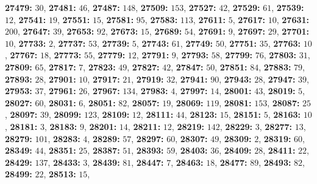 \textsf{\bfseries 27479:} $30$, \textsf{\bfseries 27481:} $46$, \textsf{\bfseries 27487:} $148$, \textsf{\bfseries 27509:} $153$, \textsf{\bfseries 27527:} $42$, \textsf{\bfseries 27529:} $61$, \textsf{\bfseries 27539:} $12$, \textsf{\bfseries 27541:} $19$, \textsf{\bfseries 27551:} $15$, \textsf{\bfseries 27581:} $95$, \textsf{\bfseries 27583:} $113$, \textsf{\bfseries 27611:} $5$, \textsf{\bfseries 27617:} $10$, \textsf{\bfseries 27631:} $200$, \textsf{\bfseries 27647:} $39$, \textsf{\bfseries 27653:} $92$, \textsf{\bfseries 27673:} $15$, \textsf{\bfseries 27689:} $54$, \textsf{\bfseries 27691:} $9$, \textsf{\bfseries 27697:} $29$, \textsf{\bfseries 27701:} $10$, \textsf{\bfseries 27733:} $2$, \textsf{\bfseries 27737:} $53$, \textsf{\bfseries 27739:} $5$, \textsf{\bfseries 27743:} $61$, \textsf{\bfseries 27749:} $50$, \textsf{\bfseries 27751:} $35$, \textsf{\bfseries 27763:} $10$, \textsf{\bfseries 27767:} $18$, \textsf{\bfseries 27773:} $55$, \textsf{\bfseries 27779:} $12$, \textsf{\bfseries 27791:} $9$, \textsf{\bfseries 27793:} $58$, \textsf{\bfseries 27799:} $76$, \textsf{\bfseries 27803:} $31$, \textsf{\bfseries 27809:} $65$, \textsf{\bfseries 27817:} $7$, \textsf{\bfseries 27823:} $49$, \textsf{\bfseries 27827:} $42$, \textsf{\bfseries 27847:} $50$, \textsf{\bfseries 27851:} $84$, \textsf{\bfseries 27883:} $79$, \textsf{\bfseries 27893:} $28$, \textsf{\bfseries 27901:} $10$, \textsf{\bfseries 27917:} $21$, \textsf{\bfseries 27919:} $32$, \textsf{\bfseries 27941:} $90$, \textsf{\bfseries 27943:} $28$, \textsf{\bfseries 27947:} $39$, \textsf{\bfseries 27953:} $37$, \textsf{\bfseries 27961:} $26$, \textsf{\bfseries 27967:} $134$, \textsf{\bfseries 27983:} $4$, \textsf{\bfseries 27997:} $14$, \textsf{\bfseries 28001:} $43$, \textsf{\bfseries 28019:} $5$, \textsf{\bfseries 28027:} $60$, \textsf{\bfseries 28031:} $6$, \textsf{\bfseries 28051:} $82$, \textsf{\bfseries 28057:} $19$, \textsf{\bfseries 28069:} $119$, \textsf{\bfseries 28081:} $153$, \textsf{\bfseries 28087:} $25$, \textsf{\bfseries 28097:} $39$, \textsf{\bfseries 28099:} $123$, \textsf{\bfseries 28109:} $12$, \textsf{\bfseries 28111:} $44$, \textsf{\bfseries 28123:} $15$, \textsf{\bfseries 28151:} $5$, \textsf{\bfseries 28163:} $10$, \textsf{\bfseries 28181:} $3$, \textsf{\bfseries 28183:} $9$, \textsf{\bfseries 28201:} $14$, \textsf{\bfseries 28211:} $12$, \textsf{\bfseries 28219:} $142$, \textsf{\bfseries 28229:} $3$, \textsf{\bfseries 28277:} $13$, \textsf{\bfseries 28279:} $101$, \textsf{\bfseries 28283:} $4$, \textsf{\bfseries 28289:} $57$, \textsf{\bfseries 28297:} $60$, \textsf{\bfseries 28307:} $49$, \textsf{\bfseries 28309:} $2$, \textsf{\bfseries 28319:} $60$, \textsf{\bfseries 28349:} $44$, \textsf{\bfseries 28351:} $25$, \textsf{\bfseries 28387:} $51$, \textsf{\bfseries 28393:} $59$, \textsf{\bfseries 28403:} $36$, \textsf{\bfseries 28409:} $28$, \textsf{\bfseries 28411:} $22$, \textsf{\bfseries 28429:} $137$, \textsf{\bfseries 28433:} $3$, \textsf{\bfseries 28439:} $81$, \textsf{\bfseries 28447:} $7$, \textsf{\bfseries 28463:} $18$, \textsf{\bfseries 28477:} $89$, \textsf{\bfseries 28493:} $82$, \textsf{\bfseries 28499:} $22$, \textsf{\bfseries 28513:} $15$, 
